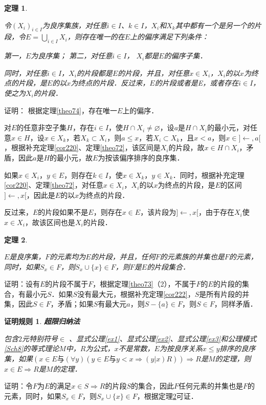 \documentclass[12pt, a4paper, oneside]{book}
\newtheorem{C}{证明规则}
\newtheorem{theo}{定理}
\begin{document}
			\begin{theo}\label{theo75}
				\hfill\par
				令$(X_i)_{i\in I}$为良序集族，对任意$i\in I$、$k\in I$，$X_i$和$X_k$其中都有一个是另一个的片段，令$E=\bigcup\limits_{i\in I}X_i$，则存在唯一的在$E$上的偏序满足下列条件：
				\par
				第一，$E$为良序集；
				第二，对任意$i\in I$， $X_i$都是$E$的偏序子集．
				\par
				同时，对任意$i\in I$，$X_i$的片段都是$E$的片段，并且，对任意$x\in X_i$，$X_i$的以$x$为终点的片段，是$E$的以$x$为终点的片段．反过来，$E$的片段或者是E，或者存在$i\in I$，使之为$X_i$的片段．
			\end{theo}
			证明：
			根据定理\ref{theo74}，存在唯一$E$上的偏序．
			\par
			对$E$的任意非空子集$H$，存在$i\in I$，使$H\cap X_i\neq \varnothing$，设$a$是$H\cap X_i$的最小元，对任意$x\in H$，设$x\in X_k$，若$X_k\subset X_i$，则$a\leq x$，若$X_i\subset X_k$，且$x<a$，则$x\in ]\gets, a[$，根据补充定理\ref{cor220}、定理\ref{theo72}，该区间是$X_i$的片段，故$x\in H\cap X_i$，矛盾，因此$a$是$H$的最小元，故$E$为按该偏序排序的良序集．
			\par
			如果$x\in X_i$，$y\in E$，则存在$k\in I$，使$x\in X_k$，$y\in X_k$．同时，根据补充定理\ref{cor220}、定理\ref{theo72}，对任意$x\in X_i$，$X_i$的以$x$为终点的片段，是$E$的区间$]\gets, x[$，因此是$E$的以$x$为终点的片段．
			\par
			反过来，$E$的片段如果不是$E$，则存在$x\in E$，该片段为$]\gets, x[$，由于存在$X_i$使$x\in X_i$，故该区间也是$X_i$的片段．
			
			\begin{theo}\label{theo76}
				\hfill\par
				$E$是良序集，$F$的元素均为$E$的片段，并且，任何$F$的元素族的并集也是$F$的元素，同时，如果$S_x\in F$，则$S_x\cup\{x\}\in F$，则$F$是$E$的片段集合．
			\end{theo}
			证明：设有$E$的片段不属于$F$，根据定理\ref{theo73}（2），不属于$F$的$E$的片段的集合，有最小元$S$．如果$S$没有最大元，根据补充定理\ref{cor222}，$S$是所有片段的并集，因此$S\in F$，矛盾；如果$S$有最大元$a$，则$S-\{a\}\in F$，则$S\in F$，同样矛盾．

			\begin{C}\label{C59}
				\textbf{超限归纳法}
				\par
				包含$2$元特别符号$\in$ 、显式公理\ref{ex1}、显式公理\ref{ex2}、显式公理\ref{ex3}和公理模式\ref{Sch8}的等式理论$M$中，$R$为公式，$x$不是常数，$E$为按良序关系$x\leq y$排序的良序集，如果$(x\in E\text{与}(\forall y)(y\in E\text{与}y<x\Rightarrow (y|x)R))\Rightarrow R$是$M$的定理，则$x\in E\Rightarrow R$是$M$的定理．
			\end{C}					
			证明：令$F$为$E$的满足$x\in S\Rightarrow R$的片段$S$的集合，因此$F$任何元素的并集也是$F$的元素，同时，如果$S_x\in F$，则$S_x\cup\{x\}\in F$，根据定理\ref{theo76}可证．
\end{document}
